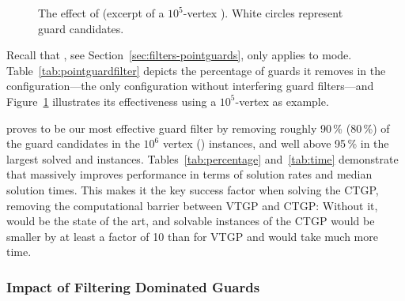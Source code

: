 \begin{figure}
	\hfill
	\caption{The effect of \pointguardfilter (excerpt of a $10^5$-vertex \parabolawalk).
		White circles represent guard candidates.}
	\label{fig:filtering-effect}
\end{figure}

Recall that \pointguardfilter, see Section~\ref{sec:filters-pointguards}, only applies to \pointguardmode mode.
Table~\ref{tab:pointguardfilter} depicts the percentage of guards it removes in the \pnodom configuration\dash---the only configuration without interfering guard filters\dash---and Figure~\ref{fig:filtering-effect} illustrates its effectiveness using a $10^5$-vertex \parabolawalk as example.

\pointguardfilter proves to be our most effective guard filter by removing roughly 90\,\% (80\,\%) of the guard candidates in the $10^6$ vertex \walk (\concavevalleys) instances, and well above 95\,\% in the largest solved \sinewalk and \parabolawalk instances.
Tables~\ref{tab:percentage} and~\ref{tab:time} demonstrate that \pointguardfilter massively improves performance in terms of solution rates and median solution times.
This makes it the key success factor when solving the \ac{CTGP}, removing the computational barrier between \ac{VTGP} and \ac{CTGP}:
Without it, \pnoedge would be the state of the art, and solvable instances of the \ac{CTGP} would be smaller by at least a factor of 10 than for \ac{VTGP} and would take much more time.

\subsubsection{Impact of Filtering Dominated Guards}
\label{sec:experiments-dom}

